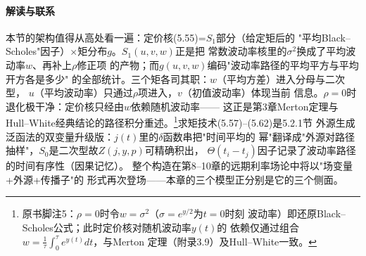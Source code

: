 \paragraph{解读与联系}
本节的架构值得从高处看一遍：定价核(5.55)=$S_{1}$部分（给定矩后的
"平均Black--Scholes"因子）$\times$矩分布$g$。$S_{1}(u,v,w)$正是把
常数波动率核里的$\sigma^{2}$换成了平均波动率$w$、再补上$\rho$修正项
的产物；而$g(u,v,w)$编码"波动率路径的平均平方与平均开方各是多少"
的全部统计。三个矩各司其职：$w$（平均方差）进入分母与二次型，
$u$（平均波动率）只通过$\rho$项进入，$v$（初值波动率）体现当前
信息。$\rho=0$时退化极干净：定价核只经由$w$依赖随机波动率——
这正是第3章Merton定理与Hull--White经典结论的路径积分重述。\footnote{%
原书脚注5：$\rho=0$时令$w=\sigma^{2}$（$\sigma=e^{y/2}$为$t=0$时刻
波动率）即还原Black--Scholes公式；此时定价核对随机波动率$y(t)$的
依赖仅通过组合$w=\frac{1}{\tau}\int_{0}^{\tau}e^{y(t)}dt$，与Merton
定理（附录3.9）及Hull--White一致。}求矩技术(5.57)--(5.62)是5.2.1节
外源生成泛函法的双变量升级版：$j(t)$里的$\delta$函数串把"时间平均的
幂"翻译成"外源对路径抽样"，$S_{0}$是二次型故$Z(j,y,p)$可精确积出，
$\Theta(t_{i}-t_{j})$因子记录了波动率路径的时间有序性（因果记忆）。
整个构造在第8--10章的远期利率场论中将以"场变量+外源+传播子"的
形式再次登场——本章的三个模型正分别是它的三个侧面。


